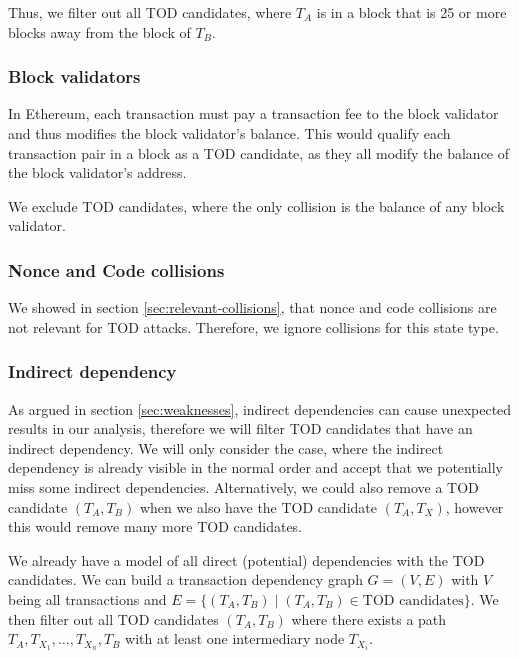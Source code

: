 \documentclass[draft,final]{vutinfth} %
\begin{document}
Thus, we filter out all TOD candidates, where $T_A$ is in a block that is 25 or more blocks away from the block of $T_B$.

\subsubsection{Block validators}

In Ethereum, each transaction must pay a transaction fee to the block validator and thus modifies the block validator's balance. This would qualify each transaction pair in a block as a TOD candidate, as they all modify the balance of the block validator's address.

We exclude TOD candidates, where the only collision is the balance of any block validator.


\subsubsection{Nonce and Code collisions}

We showed in section \ref{sec:relevant-collisions}, that nonce and code collisions are not relevant for TOD attacks. Therefore, we ignore collisions for this state type.

\subsubsection{Indirect dependency}

As argued in section \ref{sec:weaknesses}, indirect dependencies can cause unexpected results in our analysis, therefore we will filter TOD candidates that have an indirect dependency. We will only consider the case, where the indirect dependency is already visible in the normal order and accept that we potentially miss some indirect dependencies. Alternatively, we could also remove a TOD candidate $(T_A, T_B)$ when we also have the TOD candidate $(T_A, T_X)$, however this would remove many more TOD candidates.

We already have a model of all direct (potential) dependencies with the TOD candidates. We can build a transaction dependency graph $G = (V, E)$ with $V$ being all transactions and $E = \{ (T_A, T_B) \mid (T_A, T_B) \in \text{TOD candidates} \}$. We then filter out all TOD candidates $(T_A, T_B)$ where there exists a path $T_A, T_{X_1}, \dots, T_{X_n}, T_B$ with at least one intermediary node $T_{X_i}$.
\end{document}
